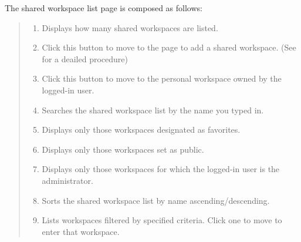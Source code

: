 \documentclass[letterpaper,10pt,english]{sphinxmanual}
\begin{document}
The shared workspace list page is composed as follows:
\begin{quote}

\begin{figure}[H]
\centering

\noindent{}
\end{figure}
\begin{enumerate}
\def\theenumi{\arabic{enumi}}
\def\labelenumi{\theenumi .}
\makeatletter\def\p@enumii{\p@enumi \theenumi .}\makeatother
\item {} 
 Displays how many shared workspaces are listed.

\item {} 
 Click this button to move to the page to add a shared workspace. (See {\hyperref[\detokenize{discovery/part03/shared_workspace:shared-workspace-creation}]{}} for a deailed procedure)

\item {} 
 Click this button to move to the personal workspace owned by the logged-in user.

\item {} 
 Searches the shared workspace list by the name you typed in.

\item {} 
 Displays only those workspaces designated as favorites.

\item {} 
 Displays only those workspaces set as public.

\item {} 
 Displays only those workspaces for which the logged-in user is the administrator.

\item {} 
 Sorts the shared workspace list by name ascending/descending.

\item {} 
 Lists workspaces filtered by specified criteria. Click one to move to enter that workspace.

\end{enumerate}
\end{quote}
\end{document}
